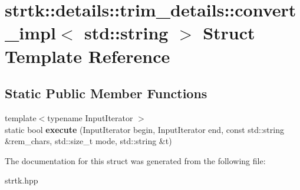 \hypertarget{structstrtk_1_1details_1_1trim__details_1_1convert__impl_3_01std_1_1string_01_4}{\section{strtk\-:\-:details\-:\-:trim\-\_\-details\-:\-:convert\-\_\-impl$<$ std\-:\-:string $>$ Struct Template Reference}
\label{structstrtk_1_1details_1_1trim__details_1_1convert__impl_3_01std_1_1string_01_4}
}
\subsection*{Static Public Member Functions}
\begin{DoxyCompactItemize}
\item 
\hypertarget{structstrtk_1_1details_1_1trim__details_1_1convert__impl_3_01std_1_1string_01_4_ac32f3868e2e2c43c8109635570581bc1}{{\footnotesize template$<$typename Input\-Iterator $>$ }\\static bool {\bfseries execute} (Input\-Iterator begin, Input\-Iterator end, const std\-::string \&rem\-\_\-chars, std\-::size\-\_\-t mode, std\-::string \&t)}\label{structstrtk_1_1details_1_1trim__details_1_1convert__impl_3_01std_1_1string_01_4_ac32f3868e2e2c43c8109635570581bc1}

\end{DoxyCompactItemize}


The documentation for this struct was generated from the following file\-:\begin{DoxyCompactItemize}
\item 
strtk.\-hpp\end{DoxyCompactItemize}
